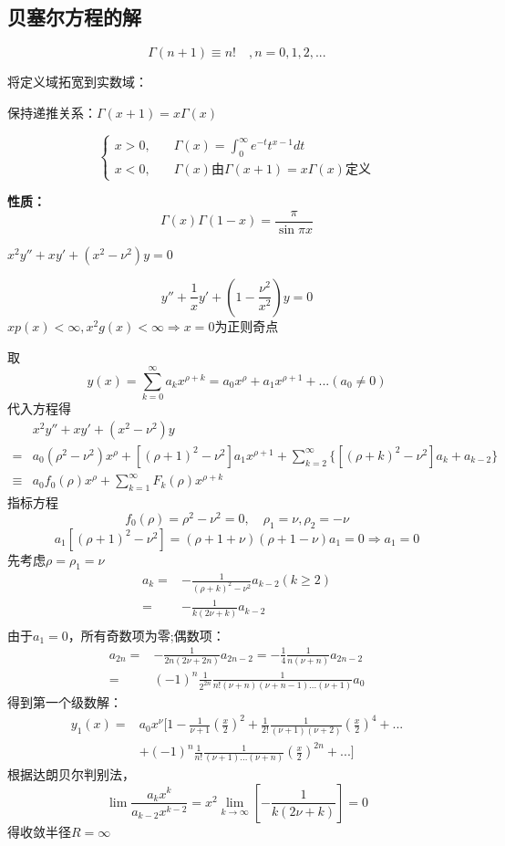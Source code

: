 \subsection{贝塞尔方程的解}
\label{Bessel}
\begin{dfn}[Gamma函数]
    $$\boxed{\Gamma(n+1)\equiv n!\quad,n=0,1,2,...}$$
    
    \noindent 将定义域拓宽到实数域：

    保持递推关系：$\boxed{\Gamma(x+1)=x\Gamma(x)}$

    $$\begin{cases}
    x>0,\quad&\Gamma(x)=\int_0^\infty e^{-t}t^{x-1}dt\\
    x<0,\quad&\Gamma(x)\mbox{由}\Gamma(x+1)=x\Gamma(x)\mbox{定义}
    \end{cases}$$

    \noindent \textbf{性质：}
    $$\Gamma(x)\Gamma(1-x)=\frac{\pi}{\sin\pi x}$$
    \end{dfn}

\begin{dfn}[Bessel方程]
    $x^2y''+xy'+(x^2-\nu^2)y=0$
\end{dfn}
    $$y''+\frac{1}{x}y'+(1-\frac{\nu^2}{x^2})y=0$$
    $xp(x)<\infty,x^2g(x)<\infty\Rightarrow x=0$为正则奇点

    取
    $$y(x)=\sum_{k=0}^\infty a_kx^{\rho+k}=a_0x^\rho+a_1x^{\rho+1}+...(a_0\ne0)$$
    代入方程得
    $$\begin{aligned}
    &x^2y''+xy'+(x^2-\nu^2)y\\
    =&a_0(\rho^2-\nu^2)x^\rho+[(\rho+1)^2-\nu^2]a_1x^{\rho+1}+\sum_{k=2}^\infty\{[(\rho+k)^2-\nu^2]a_k+a_{k-2}\}\\
    \equiv&a_0f_0(\rho)x^\rho+\sum_{k=1}^\infty F_k(\rho)x^{\rho+k} 
    \end{aligned}$$
    指标方程
    $$f_0(\rho)=\rho^2-\nu^2=0,\quad\rho_1=\nu,\rho_2=-\nu$$
    $$a_1[(\rho+1)^2-\nu^2]=(\rho+1+\nu)(\rho+1-\nu)a_1=0\Rightarrow a_1=0$$
    先考虑$\rho=\rho_1=\nu$
    $$\begin{aligned}
    a_k=&-\frac{1}{(\rho+k)^2-\nu^2}a_{k-2}(k\ge2)\\
    =&-\frac{1}{k(2\nu+k)}a_{k-2}\\
    \end{aligned}$$
    由于$a_1=0$，所有奇数项为零;偶数项：
    $$\begin{aligned}
    a_{2n}=&-\frac{1}{2n(2\nu+2n)}a_{2n-2}=-\frac{1}{4}\frac{1}{n(\nu+n)}a_{2n-2}\\
    =&(-1)^n\frac{1}{2^{2n}}\frac{1}{n!(\nu+n)(\nu+n-1)...(\nu+1)}a_0
    \end{aligned}$$
    得到第一个级数解：
    $$\begin{aligned}
    y_1(x)=&a_0x^\nu[1-\frac{1}{\nu+1}\left(\frac{x}{2}\right)^2+\frac{1}{2!}\frac{1}{(\nu+1)(\nu+2)}\left(\frac{x}{2}\right)^4+...
    \\&+(-1)^n\frac{1}{n!}\frac{1}{(\nu+1)...(\nu+n)}\left(\frac{x}{2}\right)^{2n}+...]
    \end{aligned}$$
    根据达朗贝尔判别法，
    $$\lim\frac{a_kx^k}{a_{k-2}x^{k-2}}=x^2\lim_{k\rightarrow\infty}\left[-\frac{1}{k(2\nu+k)}\right]=0$$
    得收敛半径$R=\infty$

